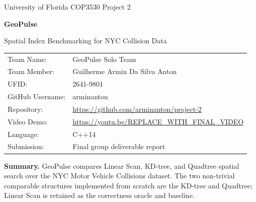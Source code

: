 \documentclass[12pt]{article}
\begin{document}
\begin{titlepage}
\centering
{\Large University of Florida COP3530 Project 2\par}
\vspace{0.4in}
{\Huge\bfseries GeoPulse\par}
\vspace{0.2in}
{\Large Spatial Index Benchmarking for NYC Collision Data\par}
\vfill
\begin{tabular}{ll}
Team Name: & GeoPulse Solo Team\\
Team Member: & Guilherme Armin Da Silva Anton\\
UFID: & 2641-9801\\
GitHub Username: & arminanton\\
Repository: & \url{https://github.com/arminanton/project-2}\\
Video Demo: & \url{https://youtu.be/REPLACE_WITH_FINAL_VIDEO}\\
Language: & C++14\\
Submission: & Final group deliverable report\\
\end{tabular}
\vfill
\textbf{Summary.} GeoPulse compares Linear Scan, KD-tree, and Quadtree
spatial search over the NYC Motor Vehicle Collisions dataset. The two
non-trivial comparable structures implemented from scratch are the KD-tree and
Quadtree; Linear Scan is retained as the correctness oracle and baseline.
\end{titlepage}
\end{document}
